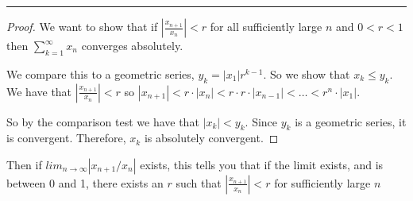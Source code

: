 \documentclass[11pt]{article}
\begin{document}
\hrule

\begin{proof}
    
    We want to show that if $\left| \frac{x_{n+1}}{x_n} \right| < r$ for all sufficiently large $n$ and $0 < r < 1$
    then $\sum_{k=1} ^\infty x_n$ converges absolutely.

    We compare this to a geometric series, $y_k = |x_1| r^{k-1}$. So we show that $x_k \leq y_k$. 
    We have that $\left| \frac{x_{n+1}}{x_n} \right| < r$
    so $|x_{n+1}| < r \cdot |x_n| < r \cdot r \cdot |x_{n-1}| < \ldots < r^{n} \cdot |x_1|$. 

    So by the comparison test we have that $|x_k| < y_k$. Since $y_k$ is a geometric series, it is convergent.
    Therefore, $x_k$ is absolutely convergent. 

\end{proof}


Then if $lim_{n \to \infty} |x_{n+1} / x_n|$ exists, this tells you that if the limit exists, and is between 0 and 1,
there exists an $r$ such that $\left| \frac{x_{n+1}}{x_n} \right| < r$ for sufficiently large $n$
\end{document}
